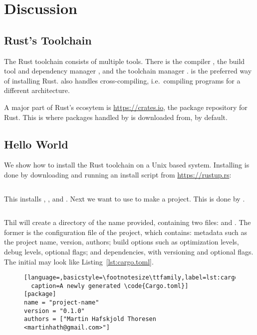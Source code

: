 \documentclass[b5paper,twoside]{report}
\begin{document}
\chapter{Discussion}

\begin{appendices}
  \chapter{Rust's Toolchain}
  The Rust toolchain consists of multiple tools.
  There is the compiler \rustc{}, the build tool and dependency manager \cargo{},
  and the toolchain manager \rustup.
  \rustup{} is the preferred way of installing Rust.
  \rustup{} also handles cross-compiling, i.e.\ compiling programs for a different
  architecture.

  A major part of Rust's ecosytem is \url{https://crates.io}, the package repository
  for Rust. This is where packages handled by \cargo{} is downloaded from, by default.

  \section*{Hello World}
  We show how to install the Rust toolchain on a Unix based system.
  Installing \rustup{} is done by downloading and running an install script from
  \url{https://rustup.rs}:
  \begin{lstlisting}[language=Bash,numbers=none]
% curl https://sh.rustup.rs -sSf | sh
  \end{lstlisting}
  This installs \rustup{}, \cargo{}, and \rustc{}.
  Next we want to use \cargo{} to make a project. This is done by .
  \begin{lstlisting}[language=Bash,numbers=none]
% cargo init --bin <name-of-project>
  \end{lstlisting}
  Thil will create a directory of the name provided, containing two files:
   and .
  The former is the configuration file of the project, which contains:
  metadata such as the project name, version, authors;
  build options such as optimization levels, debug levels, optional flags;
  and dependencies, with versioning and optional flags.
  The initial  may look like Listing~\ref{lst:cargo.toml}.
  \begin{figure}[ht]
  \begin{lstlisting}[language=,basicstyle=\footnotesize\ttfamily,label=lst:cargo.toml,
  caption=A newly generated \code{Cargo.toml}]
[package]
name = "project-name"
version = "0.1.0"
authors = ["Martin Hafskjold Thoresen <martinhath@gmail.com>"]


\end{lstlisting}
\end{figure}
\end{appendices}
\end{document}
